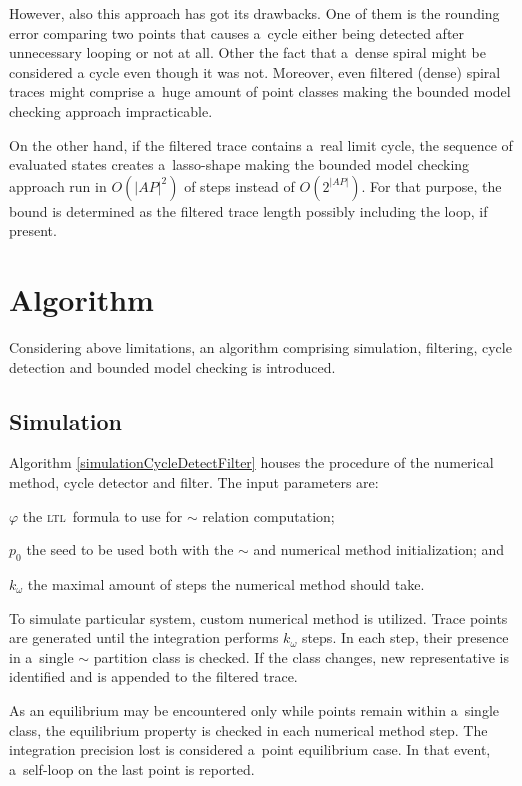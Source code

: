 \documentclass[12pt,twoside,draft]{fithesis}
\newcommand{\ltl}{\textsc{ltl}~}
\begin{document}
However, also this approach has got its drawbacks. One of them
is the rounding error comparing two points that causes a~cycle either
being detected after unnecessary looping or not at all. Other the fact
that a~dense spiral might be considered a cycle even though it was not.
Moreover, even filtered (dense) spiral traces might comprise a~huge
amount of point classes making the bounded model checking approach
impracticable.

On the other hand, if the filtered trace contains a~real limit cycle,
the sequence of evaluated states creates a~lasso-shape making the
bounded model checking approach run in $O(|AP|^2)$ of steps
instead of $O(2^{|AP|})$\cite{biere}. For that purpose, the bound is
determined as the filtered trace length possibly including the loop, if
present.

\section{Algorithm}
Considering above limitations, an algorithm comprising simulation,
filtering, cycle detection and bounded model checking is introduced.
\subsection*{Simulation}
Algorithm \ref{simulationCycleDetectFilter} houses the procedure of
the numerical method, cycle detector and filter. The input parameters are:
\begin{inparaenum}
	\item{$\varphi$} the \ltl formula to use for $\sim$ relation
		computation;
	\item{$p_0$} the seed to be used both with the $\sim$ and numerical
		method initialization; and
	\item{$k_{\omega}$} the maximal amount of steps the numerical method
		should take.
\end{inparaenum}

To simulate particular system, custom numerical method is utilized.
Trace points are generated until the integration performs $k_{\omega}$
steps. In each step, their presence in a~single $\sim$ partition class
is checked. If the class changes, new representative is identified
and is appended to the filtered trace.

As an equilibrium may be encountered only while points remain within
a~single class, the equilibrium property is checked in each numerical
method step. The integration precision lost is considered a~point
equilibrium case. In that event, a~self-loop on the last point is
reported.
\end{document}
